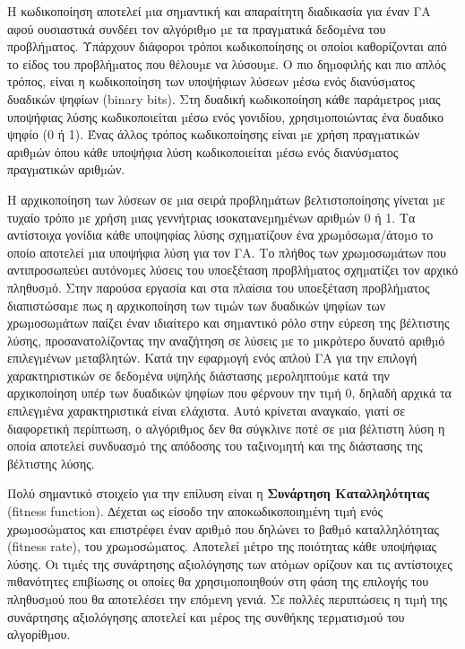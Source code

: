 Η κωδικοποίηση αποτελεί µια σηµαντική και απαραίτητη διαδικασία για έναν ΓΑ αφού ουσιαστικά συνδέει τον αλγόριθµο µε τα πραγµατικά δεδοµένα του προβλήµατος. Υπάρχουν διάφοροι τρόποι κωδικοποίησης οι οποίοι καθορίζονται από το είδος του προβλήµατος που θέλουµε να λύσουµε. Ο πιο δηµοφιλής και πιο απλός τρόπος, είναι η κωδικοποίηση των υποψήφιων λύσεων µέσω ενός διανύσµατος δυαδικών ψηφίων (binary bits). Στη δυαδική κωδικοποίηση κάθε παράµετρος µιας υποψήφιας λύσης κωδικοποιείται µέσω ενός γονιδίου, χρησιµοποιώντας ένα δυαδικο ψηφίο (0 ή 1). Ένας άλλος τρόπος κωδικοποίησης είναι µε χρήση πραγµατικών αριθµών όπου κάθε υποψήφια λύση κωδικοποιείται µέσω ενός διανύσµατος πραγµατικών αριθµών.

Η αρχικοποίηση των λύσεων σε µια σειρά προβληµάτων βελτιστοποίησης γίνεται µε τυχαίο τρόπο µε χρήση µιας γεννήτριας ισοκατανεµηµένων αριθµών 0 ή 1. Τα αντίστοιχα γονίδια κάθε υποψηφίας λύσης σχηµατίζουν ένα χρωµόσωµα/άτοµο το οποίο αποτελεί µια υποψήφια λύση για τον ΓΑ. Το πλήθος των χρωµοσωµάτων που αντιπροσωπεύει αυτόνοµες λύσεις του υποεξέταση προβλήµατος σχηµατίζει τον αρχικό πληθυσµό. Στην παρούσα εργασία και στα πλαίσια του υποεξέταση προβλήµατος διαπιστώσαµε πως η αρχικοποίηση των τιµών των δυαδικών ψηφίων των χρωµοσωµάτων παίζει έναν ιδιαίτερο και σηµαντικό ρόλο στην εύρεση της βέλτιστης λύσης, προσανατολίζοντας την αναζήτηση σε λύσεις µε το µικρότερο δυνατό αριθµό επιλεγµένων µεταβλητών. Κατά την εφαρµογή ενός απλού ΓΑ για την επιλογή χαρακτηριστικών σε δεδοµένα υψηλής διάστασης µεροληπτούµε κατά την αρχικοποίηση υπέρ των δυαδικών ψηφίων που φέρνουν την τιµή 0, δηλαδή αρχικά τα επιλεγµένα χαρακτηριστικά είναι ελάχιστα. Αυτό κρίνεται αναγκαίο, γιατί σε διαφορετική περίπτωση, ο αλγόριθµος δεν θα σύγκλινε ποτέ σε µια βέλτιστη λύση η οποία αποτελεί συνδυασµό της απόδοσης του ταξινοµητή και της διάστασης της βέλτιστης λύσης.

\label{fFunction}
Πολύ σημαντικό στοιχείο για την επίλυση είναι η \textbf{Συνάρτηση Καταλληλότητας} (fitness function). ∆έχεται ως είσοδο την αποκωδικοποιηµένη τιµή ενός χρωµοσώµατος και επιστρέφει έναν αριθµό που δηλώνει το βαθµό καταλληλότητας (fitness rate), του χρωµοσώµατος. Αποτελεί µέτρο της ποιότητας κάθε υποψήφιας λύσης. Οι τιµές της
συνάρτησης αξιολόγησης των ατόµων ορίζουν και τις αντίστοιχες πιθανότητες επιβίωσης οι οποίες θα χρησιµοποιηθούν στη φάση της επιλογής του πληθυσµού που θα αποτελέσει την επόµενη γενιά. Σε πολλές περιπτώσεις η τιµή της συνάρτησης αξιολόγησης αποτελεί και µέρος της συνθήκης τερµατισµού του αλγορίθµου.

